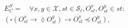 \documentclass[journal, compsoc]{IEEEtran}
\begin{document}
	\begin{align}\label{eqn:Causal}
	\begin{split}
	E^S_C =   \quad \forall x,y \in \mathcal{X}, \mathit{st} \in \mathcal{S}_t, O_\mathit{st}^x, O_\mathit{st}^{y} \in \mathit{st}: \\ \left( \square \left( O_\mathit{st}^x \rightarrow \lozenge O_\mathit{st}^{y} \right)
	\rightarrow O_\mathit{st}^x \preccurlyeq O_\mathit{st}^{y} \right),
	\end{split}
	\end{align} %
\end{document}
